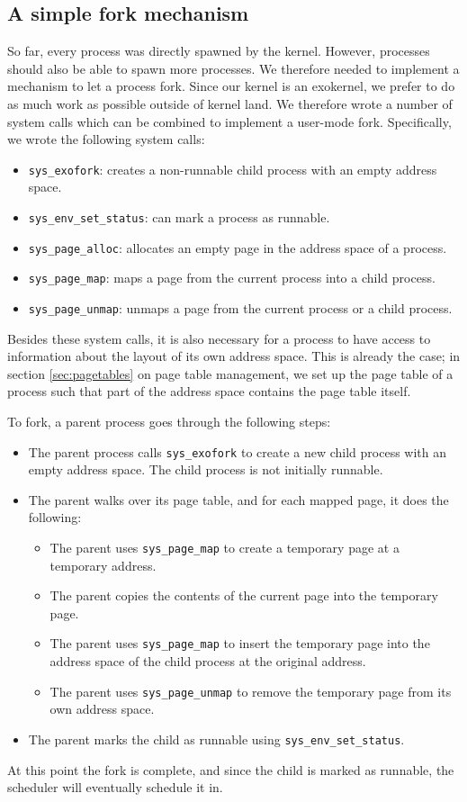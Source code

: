 \documentclass{article}
\begin{document}
\subsection{A simple fork mechanism}
So far, every process was directly spawned by the kernel. However, processes
should also be able to spawn more processes. We therefore needed to implement
a mechanism to let a process fork. Since our kernel is an exokernel, we prefer
to do as much work as possible outside of kernel land. We therefore wrote a
number of system calls which can be combined to implement a user-mode fork.
Specifically, we wrote the following system calls:
\begin{itemize}
\item	\texttt{sys\_exofork}: creates a non-runnable child process with an empty address space.
\item	\texttt{sys\_env\_set\_status}: can mark a process as runnable.
\item	\texttt{sys\_page\_alloc}: allocates an empty page in the address space of a process.
\item	\texttt{sys\_page\_map}: maps a page from the current process into a child process.
\item	\texttt{sys\_page\_unmap}: unmaps a page from the current process or a child process.
\end{itemize}
Besides these system calls, it is also necessary for a process to have access
to information about the layout of its own address space. This is already the
case; in section \ref{sec:pagetables} on page table management, we set up the
page table of a process such that part of the address space contains the page
table itself.

To fork, a parent process goes through the following steps:
\begin{itemize}
\item The parent process calls \texttt{sys\_exofork} to create a new child
process with an empty address space. The child process is not initially
runnable.
\item The parent walks over its page table, and for each mapped page, it does
the following:
\begin{itemize}
\item The parent uses \texttt{sys\_page\_map} to create a temporary page at a
temporary address.
\item The parent copies the contents of the current page into the temporary
page.
\item The parent uses \texttt{sys\_page\_map} to insert the temporary page
into the address space of the child process at the original address.
\item The parent uses \texttt{sys\_page\_unmap} to remove the temporary page
from its own address space.
\end{itemize}
\item The parent marks the child as runnable using
\texttt{sys\_env\_set\_status}. 
\end{itemize}
At this point the fork is complete, and since the child is marked as runnable,
the scheduler will eventually schedule it in.
\end{document}
